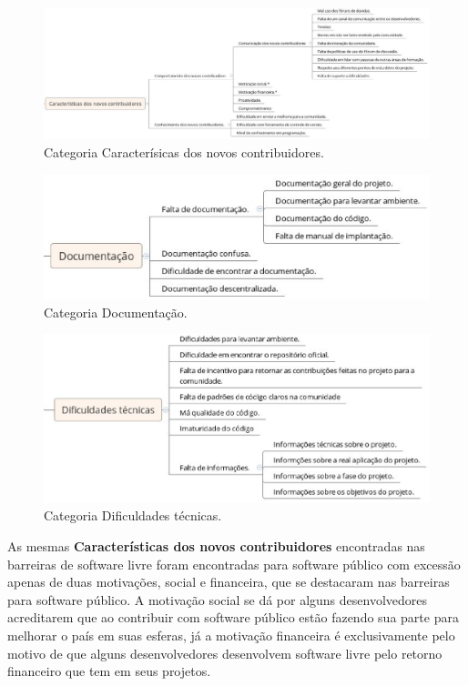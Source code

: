 \begin{figure}[h]
	\centering
	\label{fig:caracteristicas}
		\includegraphics[keepaspectratio=true,scale=0.35]{figuras/caracteristicas.eps}
	\caption{Categoria Caracterísicas dos novos contribuidores.}
\end{figure}

\begin{figure}[h]
	\centering
	\label{fig:documentacao}
		\includegraphics[keepaspectratio=true,scale=0.5]{figuras/documentacao.eps}
	\caption{Categoria Documentação.}
\end{figure}

\begin{figure}[h]
	\centering
	\label{fig:dificuldades}
		\includegraphics[keepaspectratio=true,scale=0.5]{figuras/dificuldades.eps}
	\caption{Categoria Dificuldades técnicas.}
\end{figure}

As mesmas \textbf{Características dos novos contribuidores} encontradas nas barreiras
de software livre foram encontradas para software público com excessão apenas de duas
motivações, social e financeira, que se destacaram nas barreiras para software público.
A motivação social se dá por alguns desenvolvedores acreditarem que ao contribuir com 
software público estão fazendo sua parte para melhorar o país em suas esferas, já
a motivação financeira é exclusivamente pelo motivo de que alguns desenvolvedores
desenvolvem software livre pelo retorno financeiro que tem em seus projetos.


